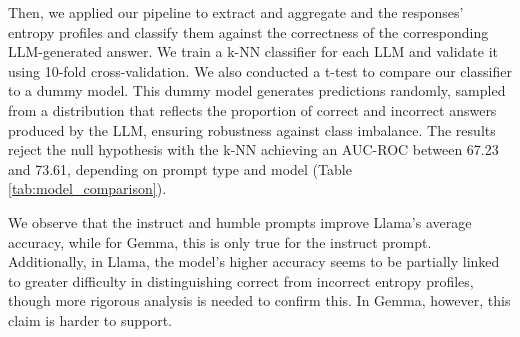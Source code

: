 Then, we applied our pipeline to extract and aggregate and the responses' entropy profiles and classify them against the correctness of the corresponding LLM-generated answer. We train a k-NN classifier for each LLM and validate it using 10-fold cross-validation. We also conducted a t-test to compare our classifier to a dummy model. This dummy model generates predictions randomly, sampled from a distribution that reflects the proportion of correct and incorrect answers produced by the LLM, ensuring robustness against class imbalance. The results reject the null hypothesis with the k-NN achieving an AUC-ROC between 67.23 and 73.61, depending on prompt type and model (Table \ref{tab:model_comparison}).


We observe that the instruct and humble prompts improve Llama's average accuracy, while for Gemma, this is only true for the instruct prompt.
Additionally, in Llama, the model's higher accuracy seems to be partially linked to greater difficulty in distinguishing correct from incorrect entropy profiles, though more rigorous analysis is needed to confirm this. In Gemma, however, this claim is harder to support.






